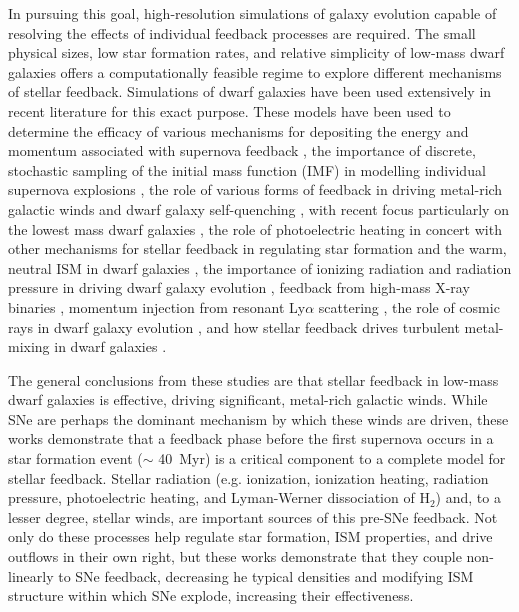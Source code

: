 \documentclass[twocolumn]{aastex62}
\begin{document}
In pursuing this goal, high-resolution simulations of galaxy evolution capable of resolving the effects of individual feedback processes are required. The small physical sizes, low star formation rates, and relative simplicity of low-mass dwarf galaxies offers a computationally feasible regime to explore different mechanisms of stellar feedback. Simulations of dwarf galaxies have been used extensively in recent literature for this exact purpose. These models have been used to determine the efficacy of various mechanisms for depositing the energy and momentum associated with supernova feedback \citep{Smith2018b,Hu2019}, the importance of discrete, stochastic sampling of the initial mass function (IMF) in modelling individual supernova explosions \citep[e.g.]{Revaz2016,Su2018,Applebaum2020}, the role of various forms of feedback in driving metal-rich galactic winds and dwarf galaxy self-quenching \citep[e.g.][]{MacLowFerrara1999,RecchiHensler2013,Robles-Valdez2017}, with recent focus particularly on the lowest mass dwarf galaxies \citep[e.g.][]{Bland-Hawthorn2015,Cashmore2017,Romano2019}, the role of photoelectric heating in concert with other mechanisms for stellar feedback in regulating star formation and the warm, neutral ISM in dwarf galaxies \citep{Forbes2016,Hu2015,Hu2017}, the importance of ionizing radiation and radiation pressure in driving dwarf galaxy evolution \citep[e.g.][]{WiseAbel2012, Emerick2018a, Agertz2020}, feedback from high-mass X-ray binaries \citep{Artale2015,Garratt-Smithson2019}, momentum injection from resonant Ly$\alpha$ scattering \citep{Kimm2018}, the role of cosmic rays in dwarf galaxy evolution \citep[e.g.][more]{Chen2016}, and how stellar feedback drives turbulent metal-mixing in dwarf galaxies \citep[e.g.][]{Ritter2015,Corlies2018}.

The general conclusions from these studies are that stellar feedback in low-mass dwarf galaxies is effective, driving significant, metal-rich galactic winds. While SNe are perhaps the dominant mechanism by which these winds are driven, these works demonstrate that a feedback phase before the first supernova occurs in a star formation event ($\sim$ 40~Myr) is a critical component to a complete model for stellar feedback. Stellar radiation (e.g. ionization, ionization heating, radiation pressure, photoelectric heating, and Lyman-Werner dissociation of H$_2$) and, to a lesser degree, stellar winds, are important sources of this pre-SNe feedback. Not only do these processes help regulate star formation, ISM properties, and drive outflows in their own right, but these works demonstrate that they couple non-linearly to SNe feedback, decreasing he typical densities and modifying ISM structure within which SNe explode, increasing their effectiveness. 
\end{document}
